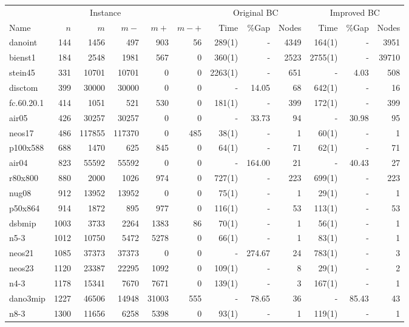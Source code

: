 \begin{sidewaystable}[Hp]
\scriptsize
\begin{center}
\begin{tabular}{lrrrrr|rrr|rrr}
\hline
\multicolumn{6}{c|}{Instance} &
\multicolumn{3}{c|}{Original BC} &
\multicolumn{3}{c}{Improved BC} \\
Name & $n$ & $m$ & $m-$ & $m+$ & $m-+$ & Time & \%Gap & Nodes & Time & \%Gap & Nodes	\\
\hline\hline
danoint	&	144	&	1456	&	497	&	903	&	56	&	289(1)	&	-	&	4349	&	164(1)	&	-	&	3951	\\
bienst1	&	184	&	2548	&	1981	&	567	&	0	&	360(1)	&	-	&	2523	&	2755(1)	&	-	&	39710	\\
stein45	&	331	&	10701	&	10701	&	0	&	0	&	2263(1)	&	-	&	651	&	-	&	4.03	&	508	\\
disctom	&	399	&	30000	&	30000	&	0	&	0	&	-	&	14.05	&	68	&	642(1)	&	-	&	16	\\
fc.60.20.1	&	414	&	1051	&	521	&	530	&	0	&	181(1)	&	-	&	399	&	172(1)	&	-	&	399	\\
air05	&	426	&	30257	&	30257	&	0	&	0	&	-	&	33.73	&	94	&	-	&	30.98	&	95	\\
neos17	&	486	&	117855	&	117370	&	0	&	485	&	38(1)	&	-	&	1	&	60(1)	&	-	&	1	\\
p100x588	&	688	&	1470	&	625	&	845	&	0	&	64(1)	&	-	&	71	&	62(1)	&	-	&	71	\\
air04	&	823	&	55592	&	55592	&	0	&	0	&	-	&	164.00	&	21	&	-	&	40.43	&	27	\\
r80x800	&	880	&	2000	&	1026	&	974	&	0	&	727(1)	&	-	&	223	&	699(1)	&	-	&	223	\\
nug08	&	912	&	13952	&	13952	&	0	&	0	&	75(1)	&	-	&	1	&	29(1)	&	-	&	1	\\
p50x864	&	914	&	1872	&	895	&	977	&	0	&	116(1)	&	-	&	53	&	113(1)	&	-	&	53	\\
dsbmip	&	1003	&	3733	&	2264	&	1383	&	86	&	70(1)	&	-	&	1	&	56(1)	&	-	&	1	\\
n5-3	&	1012	&	10750	&	5472	&	5278	&	0	&	66(1)	&	-	&	1	&	83(1)	&	-	&	1	\\
neos21	&	1085	&	37373	&	37373	&	0	&	0	&	-	&	274.67	&	24	&	783(1)	&	-	&	3	\\
neos23	&	1120	&	23387	&	22295	&	1092	&	0	&	109(1)	&	-	&	8	&	29(1)	&	-	&	2	\\
n4-3	&	1178	&	15341	&	7670	&	7671	&	0	&	139(1)	&	-	&	3	&	167(1)	&	-	&	1	\\
dano3mip	&	1227	&	46506	&	14948	&	31003	&	555	&	-	&	78.65	&	36	&	-	&	85.43	&	43	\\
n8-3	&	1300	&	11656	&	6258	&	5398	&	0	&	93(1)	&	-	&	1	&	119(1)	&	-	&	1	\\

\end{tabular}
\end{center}
\end{sidewaystable}
